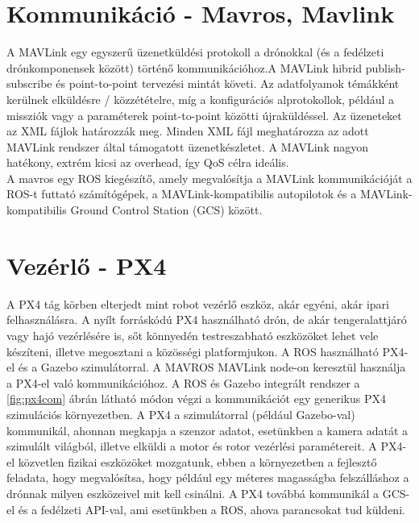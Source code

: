 \section{Kommunikáció - Mavros, Mavlink}
A MAVLink egy egyszerű üzenetküldési protokoll a drónokkal (és a fedélzeti drónkomponensek között) történő kommunikációhoz.A MAVLink hibrid publish-subscribe és point-to-point tervezési mintát követi. Az adatfolyamok témákként kerülnek elküldésre / közzétételre, míg a konfigurációs alprotokollok, például a missziók vagy a paraméterek point-to-point közötti újraküldéssel. Az üzeneteket az XML fájlok határozzák meg. Minden XML fájl meghatározza az adott MAVLink rendszer által támogatott üzenetkészletet. \cite{mavlink} A MAVLink nagyon hatékony, extrém kicsi az overhead, így QoS célra ideális. \\
\noindent
A mavros egy ROS kiegészítő, amely megvalósítja a MAVLink kommunikációját a ROS-t futtató számítógépek, a MAVLink-kompatibilis autopilotok és a MAVLink-kompatibilis Ground Control Station (GCS) között.

\section{Vezérlő - PX4}
A PX4 tág körben elterjedt mint robot vezérlő eszköz, akár egyéni, akár ipari felhasználásra. A nyílt forráskódú PX4 használható drón, de akár tengeralattjáró vagy hajó vezérlésére is, sőt könnyedén testreszabható eszközöket lehet vele készíteni, illetve megosztani a közösségi platformjukon. \cite{px4}
A ROS használható PX4-el és a Gazebo szimulátorral. A MAVROS MAVLink node-on keresztül használja a PX4-el való kommunikációhoz. A ROS és Gazebo integrált rendszer a \ref{fig:px4com} ábrán látható módon végzi a kommunikációt egy generikus PX4 szimulációs környezetben. A PX4 a szimulátorral (például Gazebo-val) kommunikál, ahonnan megkapja a szenzor adatot, esetünkben a kamera adatát a szimulált világból, illetve elküldi a motor és rotor vezérlési paramétereit. A PX4-el közvetlen fizikai eszközöket mozgatunk, ebben a környezetben a fejlesztő feladata, hogy megvalósítsa, hogy például egy méteres magasságba felszálláshoz a drónnak milyen eszközeivel mit kell csinálni. A PX4 továbbá kommunikál a GCS-el és a fedélzeti API-val, ami esetünkben a ROS, ahova parancsokat tud küldeni. \cite{px4dev}

